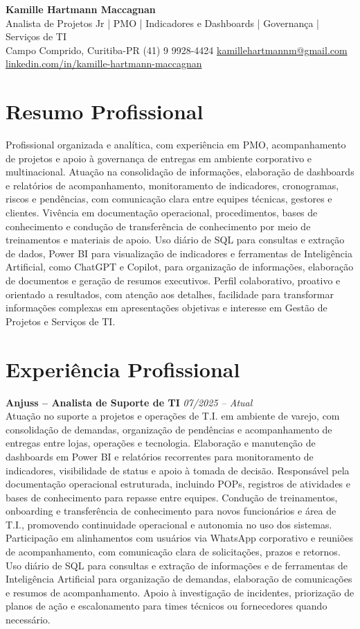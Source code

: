 \documentclass[11pt,a4paper]{article}
\newcommand{\cvheader}[4]{%
  \begin{center}
    {\LARGE\bfseries #1}\\[4pt]
    {\large #2}\\[6pt]
    #3\\[2pt]
    #4
  \end{center}
  \vspace{4pt}
}
\newcommand{\experience}[3]{%
  \textbf{#1} \hfill \textit{#2}\\[4pt]
  #3
  \vspace{8pt}
}
\begin{document}
\cvheader{Kamille Hartmann Maccagnan}%
{Analista de Projetos Jr | PMO | Indicadores e Dashboards | Governança | Serviços de TI}%
{Campo Comprido, Curitiba-PR \textbullet{} (41) 9 9928-4424 \textbullet{} \href{mailto:kamillehartmannm@gmail.com}{kamillehartmannm@gmail.com}}%
{\href{https://linkedin.com/in/kamille-hartmann-maccagnan/}{linkedin.com/in/kamille-hartmann-maccagnan}}

\section*{Resumo Profissional}

Profissional organizada e analítica, com experiência em PMO, acompanhamento de projetos e apoio à governança de entregas em ambiente corporativo e multinacional. Atuação na consolidação de informações, elaboração de dashboards e relatórios de acompanhamento, monitoramento de indicadores, cronogramas, riscos e pendências, com comunicação clara entre equipes técnicas, gestores e clientes. Vivência em documentação operacional, procedimentos, bases de conhecimento e condução de transferência de conhecimento por meio de treinamentos e materiais de apoio. Uso diário de SQL para consultas e extração de dados, Power BI para visualização de indicadores e ferramentas de Inteligência Artificial, como ChatGPT e Copilot, para organização de informações, elaboração de documentos e geração de resumos executivos. Perfil colaborativo, proativo e orientado a resultados, com atenção aos detalhes, facilidade para transformar informações complexas em apresentações objetivas e interesse em Gestão de Projetos e Serviços de TI.

\section*{Experiência Profissional}

\experience{Anjuss -- Analista de Suporte de TI}{07/2025 -- Atual}{%
Atuação no suporte a projetos e operações de T.I. em ambiente de varejo, com consolidação de demandas, organização de pendências e acompanhamento de entregas entre lojas, operações e tecnologia. Elaboração e manutenção de dashboards em Power BI e relatórios recorrentes para monitoramento de indicadores, visibilidade de status e apoio à tomada de decisão. Responsável pela documentação operacional estruturada, incluindo POPs, registros de atividades e bases de conhecimento para repasse entre equipes. Condução de treinamentos, onboarding e transferência de conhecimento para novos funcionários e área de T.I., promovendo continuidade operacional e autonomia no uso dos sistemas. Participação em alinhamentos com usuários via WhatsApp corporativo e reuniões de acompanhamento, com comunicação clara de solicitações, prazos e retornos. Uso diário de SQL para consultas e extração de informações e de ferramentas de Inteligência Artificial para organização de demandas, elaboração de comunicações e resumos de acompanhamento. Apoio à investigação de incidentes, priorização de planos de ação e escalonamento para times técnicos ou fornecedores quando necessário.}
\end{document}
